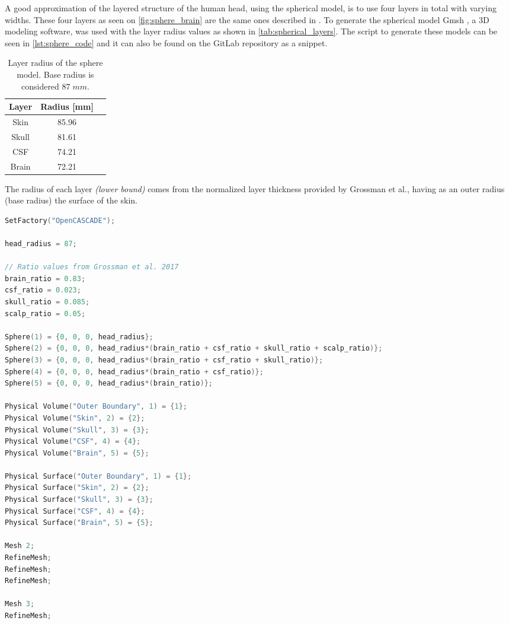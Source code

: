 A good approximation of the layered structure of the human head, using the spherical model, is to use four layers in total with varying widths. These four layers as seen on \autoref{fig:sphere_brain} are the same ones described in . To generate the spherical model Gmsh \cite{gmsh}, a 3D modeling software, was used with the layer radius values as shown in \autoref{tab:spherical_layers}. The script to generate these models can be seen in \autoref{lst:sphere_code} and it can also be found on the GitLab repository \cite{thesis_repo} as a snippet.
\begin{table}[!ht]
\begin{minipage}{.62\linewidth}
\centering
\caption{Layer radius of the sphere model. Base radius is considered $87\;\si{mm}$.}
\label{tab:spherical_layers}
\begin{tabular}{|c|c|c|}
\hline
\rowcolor[HTML]{C0C0C0} 
{\color[HTML]{000000} \textbf{Layer}} & {\color[HTML]{000000} \textbf{Radius {[}mm{]}}} \\ \hline
Skin & 85.96 \\ \hline
Skull & 81.61 \\ \hline
CSF & 74.21 \\ \hline
Brain & 72.21 \\ \hline
\end{tabular}
\end{minipage}
\end{table}

\noindent The radius of each layer \textit{(lower bound)} comes from the normalized layer thickness provided by Grossman et al.\cite[Figure S2, J and K]{Grossman2017}, having as an outer radius (base radius) the surface of the skin.

\begin{lstlisting}[language=C,caption={Sphere \gls{CAD} model generation code in \texttt{geo} format},captionpos=b, label=lst:sphere_code]
SetFactory("OpenCASCADE");

head_radius = 87;

// Ratio values from Grossman et al. 2017
brain_ratio = 0.83;
csf_ratio = 0.023;
skull_ratio = 0.085;
scalp_ratio = 0.05;

Sphere(1) = {0, 0, 0, head_radius};
Sphere(2) = {0, 0, 0, head_radius*(brain_ratio + csf_ratio + skull_ratio + scalp_ratio)};
Sphere(3) = {0, 0, 0, head_radius*(brain_ratio + csf_ratio + skull_ratio)};
Sphere(4) = {0, 0, 0, head_radius*(brain_ratio + csf_ratio)};
Sphere(5) = {0, 0, 0, head_radius*(brain_ratio)};

Physical Volume("Outer Boundary", 1) = {1};
Physical Volume("Skin", 2) = {2};
Physical Volume("Skull", 3) = {3};
Physical Volume("CSF", 4) = {4};
Physical Volume("Brain", 5) = {5};

Physical Surface("Outer Boundary", 1) = {1};
Physical Surface("Skin", 2) = {2};
Physical Surface("Skull", 3) = {3};
Physical Surface("CSF", 4) = {4};
Physical Surface("Brain", 5) = {5};

Mesh 2;
RefineMesh;
RefineMesh;
RefineMesh;

Mesh 3;
RefineMesh;
\end{lstlisting}

